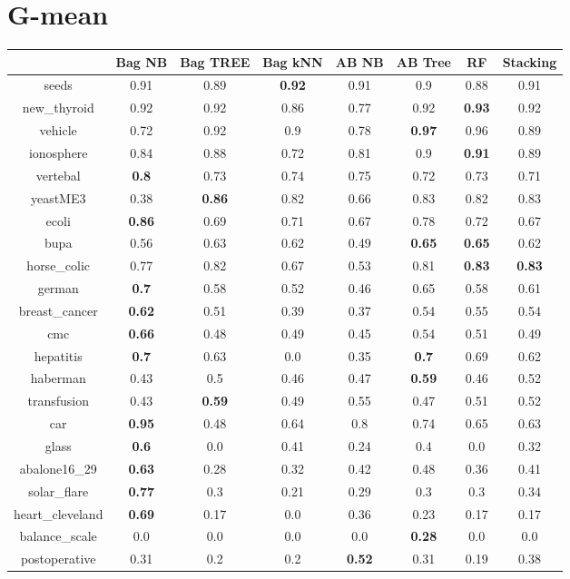 \documentclass{article}%
\begin{document}
\section*{G{-}mean}%
\begin{tabular}{c|ccccccc}%
&Bag NB&Bag TREE&Bag kNN&AB NB&AB Tree&RF&Stacking\\%
\hline%
seeds&0.91&0.89&\textbf{0.92}&0.91&0.9&0.88&0.91\\%
new\_thyroid&0.92&0.92&0.86&0.77&0.92&\textbf{0.93}&0.92\\%
vehicle&0.72&0.92&0.9&0.78&\textbf{0.97}&0.96&0.89\\%
ionosphere&0.84&0.88&0.72&0.81&0.9&\textbf{0.91}&0.89\\%
vertebal&\textbf{0.8}&0.73&0.74&0.75&0.72&0.73&0.71\\%
yeastME3&0.38&\textbf{0.86}&0.82&0.66&0.83&0.82&0.83\\%
ecoli&\textbf{0.86}&0.69&0.71&0.67&0.78&0.72&0.67\\%
bupa&0.56&0.63&0.62&0.49&\textbf{0.65}&\textbf{0.65}&0.62\\%
horse\_colic&0.77&0.82&0.67&0.53&0.81&\textbf{0.83}&\textbf{0.83}\\%
german&\textbf{0.7}&0.58&0.52&0.46&0.65&0.58&0.61\\%
breast\_cancer&\textbf{0.62}&0.51&0.39&0.37&0.54&0.55&0.54\\%
cmc&\textbf{0.66}&0.48&0.49&0.45&0.54&0.51&0.49\\%
hepatitis&\textbf{0.7}&0.63&0.0&0.35&\textbf{0.7}&0.69&0.62\\%
haberman&0.43&0.5&0.46&0.47&\textbf{0.59}&0.46&0.52\\%
transfusion&0.43&\textbf{0.59}&0.49&0.55&0.47&0.51&0.52\\%
car&\textbf{0.95}&0.48&0.64&0.8&0.74&0.65&0.63\\%
glass&\textbf{0.6}&0.0&0.41&0.24&0.4&0.0&0.32\\%
abalone16\_29&\textbf{0.63}&0.28&0.32&0.42&0.48&0.36&0.41\\%
solar\_flare&\textbf{0.77}&0.3&0.21&0.29&0.3&0.3&0.34\\%
heart\_cleveland&\textbf{0.69}&0.17&0.0&0.36&0.23&0.17&0.17\\%
balance\_scale&0.0&0.0&0.0&0.0&\textbf{0.28}&0.0&0.0\\%
postoperative&0.31&0.2&0.2&\textbf{0.52}&0.31&0.19&0.38\\%
\end{tabular}

%
\end{document}
